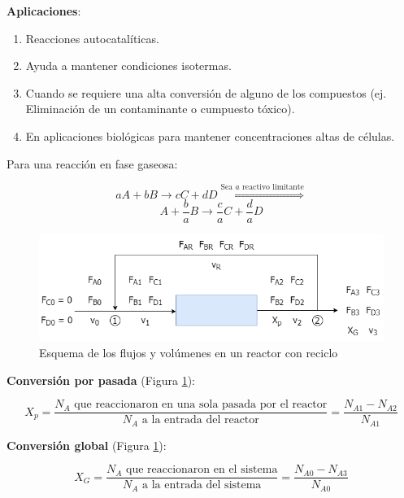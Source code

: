     \textbf{Aplicaciones}:
    
    \begin{enumerate}
        \item Reacciones autocatalíticas.
        \item Ayuda a mantener condiciones isotermas.
        \item Cuando se requiere una alta conversión de alguno de los compuestos (ej. Eliminación de un contaminante o cumpuesto tóxico).
        \item En aplicaciones biológicas para mantener concentraciones altas de células.
    \end{enumerate}
    
    Para una reacción en fase gaseosa:
    
    \[aA + bB \rightarrow cC + dD \overset{\text{Sea }a\text{ reactivo limitante}}{\Rightarrow}\]
    \[A + \frac{b}{a}B \rightarrow \frac{c}{a}C + \frac{d}{a}D\]
    
    \begin{figure}
        \centering
        \includegraphics[width=.6\textwidth]{img/diagramas/esquema_balance_reciclo.png}
        \caption{Esquema de los flujos y volúmenes en un reactor con reciclo}
        \label{fig:balance_reciclo}
    \end{figure}
    
    \textbf{Conversión por pasada} (Figura \ref{fig:balance_reciclo}):
    
    \begin{equation}
    \label{eq:conversion_por_pasada}
        X_{p} = \frac{N_{A} \text{ que reaccionaron en una sola pasada por el reactor}}{N_{A} \text{ a la entrada del reactor}} = \frac{N_{A1} - N_{A2}}{N_{A1}}
    \end{equation}
    
    \textbf{Conversión global} (Figura \ref{fig:balance_reciclo}):
    
    \begin{equation}
    \label{eq:conversion_global}
        X_{G} = \frac{N_{A} \text{ que reaccionaron en el sistema}}{N_{A} \text{ a la entrada del sistema}} = \frac{N_{A0} - N_{A3}}{N_{A0}}
    \end{equation}
    
